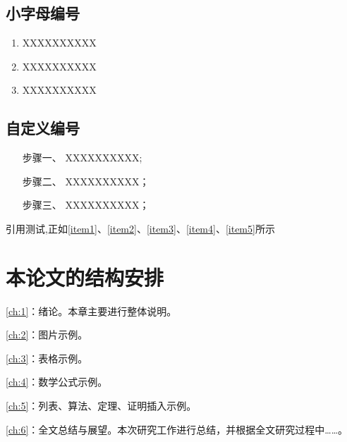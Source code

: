 \subsection{小字母编号}
\begin{enumerate}[label=\alph*)]
 \item XXXXXXXXXX
 \label{item5}
 \item XXXXXXXXXX
 \item XXXXXXXXXX
\end{enumerate}

\subsection{自定义编号}
\begin{enumerate}[leftmargin = 6em, labelsep = 0em]
    \item[步骤一、] XXXXXXXXXX;
    \item[步骤二、] XXXXXXXXXX；
    \item[步骤三、] XXXXXXXXXX；
\end{enumerate}

引用测试,正如\cref{item1}、\cref{item2}、\cref{item3}、\cref{item4}、\cref{item5}所示


\section{本论文的结构安排}
\cref{ch:1}：绪论。本章主要进行整体说明。

\cref{ch:2}：图片示例。

\cref{ch:3}：表格示例。

\cref{ch:4}：数学公式示例。

\cref{ch:5}：列表、算法、定理、证明插入示例。

\cref{ch:6}：全文总结与展望。本次研究工作进行总结，并根据全文研究过程中……。



